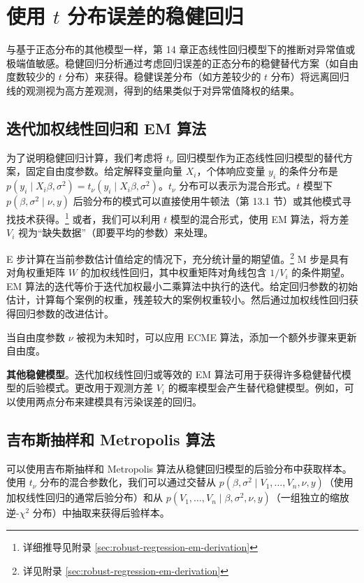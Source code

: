 \section{使用 $t$ 分布误差的稳健回归}

与基于正态分布的其他模型一样，第 14 章正态线性回归模型下的推断对异常值或极端值敏感。稳健回归分析通过考虑回归误差的正态分布的稳健替代方案（如自由度数较少的 $t$ 分布）来获得。稳健误差分布（如方差较少的 $t$ 分布）将远离回归线的观测视为高方差观测，得到的结果类似于对异常值降权的结果。

\subsection{迭代加权线性回归和 EM 算法}

为了说明稳健回归计算，我们考虑将 $t_\nu$ 回归模型作为正态线性回归模型的替代方案，固定自由度参数。给定解释变量向量 $X_i$，个体响应变量 $y_i$ 的条件分布是 $p(y_i \mid X_i \beta, \sigma^2) = t_\nu(y_i \mid X_i \beta, \sigma^2)$。$t_\nu$ 分布可以表示为混合形式。$t$ 模型下 $p(\beta, \sigma^2 \mid \nu, y)$ 后验分布的模式可以直接使用牛顿法（第 13.1 节）或其他模式寻找技术获得。\footnote{详细推导见附录 \cref{sec:robust-regression-em-derivation}} 或者，我们可以利用 $t$ 模型的混合形式，使用 EM 算法，将方差 $V_i$ 视为``缺失数据''（即要平均的参数）来处理。

E 步计算在当前参数估计值给定的情况下，充分统计量的期望值。\footnote{详见附录 \cref{sec:robust-regression-em-derivation}} M 步是具有对角权重矩阵 $W$ 的加权线性回归，其中权重矩阵对角线包含 $1/V_i$ 的条件期望。EM 算法的迭代等价于迭代加权最小二乘算法中执行的迭代。给定回归参数的初始估计，计算每个案例的权重，残差较大的案例权重较小。然后通过加权线性回归获得回归参数的改进估计。

当自由度参数 $\nu$ 被视为未知时，可以应用 ECME 算法，添加一个额外步骤来更新自由度。

\textbf{其他稳健模型}。迭代加权线性回归或等效的 EM 算法可用于获得许多稳健替代模型的后验模式。更改用于观测方差 $V_i$ 的概率模型会产生替代稳健模型。例如，可以使用两点分布来建模具有污染误差的回归。

\subsection{吉布斯抽样和 Metropolis 算法}

可以使用吉布斯抽样和 Metropolis 算法从稳健回归模型的后验分布中获取样本。使用 $t_\nu$ 分布的混合参数化，我们可以通过交替从 $p(\beta, \sigma^2 \mid V_1, \ldots, V_n, \nu, y)$（使用加权线性回归的通常后验分布）和从 $p(V_1, \ldots, V_n \mid \beta, \sigma^2, \nu, y)$（一组独立的缩放逆-$\chi^2$ 分布）中抽取来获得后验样本。

